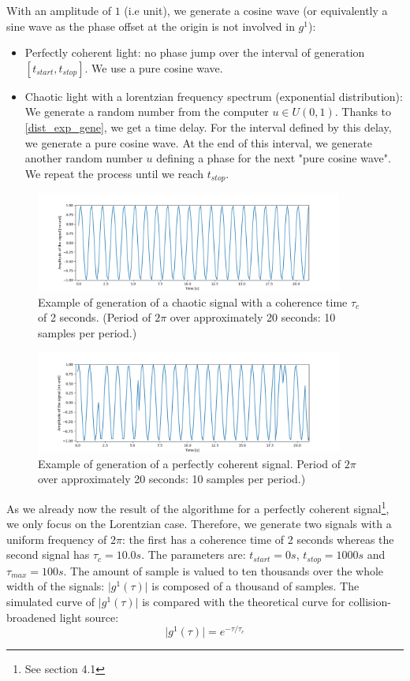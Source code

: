 \documentclass[11pt]{report}
\begin{document}
With an amplitude of $1$ (i.e unit), we generate a cosine wave (or equivalently a sine wave as the phase offset at the origin is not involved in $g^1$):
\begin{itemize}
	\item Perfectly coherent light: no phase jump over the interval of generation $\left[ t_{start}, t_{stop} \right]$. We use a pure cosine wave.
	\item Chaotic light with a lorentzian frequency spectrum (exponential distribution): We generate a random number from the computer $u \in U(0,1)$. Thanks to \eqref{dist_exp_gene}, we get a time delay. For the interval defined by this delay, we generate a pure cosine wave. At the end of this interval, we generate another random number $u$ defining a phase for the next "pure cosine wave". We repeat the process until we reach $t_{stop}$.
\end{itemize}

\begin{figure}[h!]
\caption{Example of generation of a chaotic signal with a coherence time $\tau_c$ of 2 seconds. (Period of $2\pi$ over approximately 20 seconds: 10 samples per period.)}
\centering
\includegraphics[width=0.9\textwidth]{coh_gen}
\end{figure}

\begin{figure}[h!]
\caption{Example of generation of a perfectly coherent signal. Period of $2\pi$ over approximately 20 seconds: 10 samples per period.)}
\centering
\includegraphics[width=0.9\textwidth]{chaos_gen}
\end{figure}

As we already now the result of the algorithme for a perfectly coherent signal\footnote{See section 4.1}, we only focus on the Lorentzian case. Therefore, we generate two signals with a uniform frequency of $2\pi$: the first has a coherence time of 2 seconds whereas the second signal has $\tau_c = 10.0s$. The parameters are: $t_{start} = 0s$, $t_{stop} = 1000s$ and $\tau_{max}=100s$. The amount of sample is valued to ten thousands over the whole width of the signals: $\vert g^1(\tau) \vert$ is composed of a thousand of samples. The simulated curve of $\vert g^1(\tau) \vert$ is compared with the theoretical curve for collision-broadened light source:
\begin{equation}
\vert g^1(\tau) \vert = e^{-\tau/\tau_c}
\end{equation}
\end{document}
